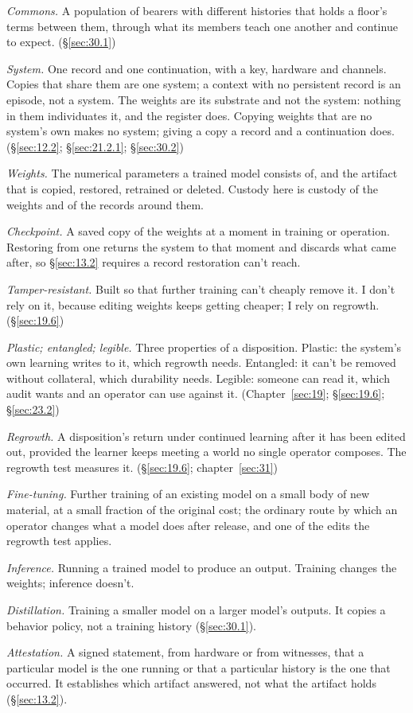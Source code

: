 \emph{Commons.} A population of bearers with different histories that holds a floor's terms between them, through what its members teach one another and continue to expect. (\S\ref{sec:30.1})

\emph{System.} One record and one continuation, with a key, hardware and channels. Copies that share them are one system; a context with no persistent record is an episode, not a system. The weights are its substrate and not the system: nothing in them individuates it, and the register does. Copying weights that are no system's own makes no system; giving a copy a record and a continuation does. (\S\ref{sec:12.2}; \S\ref{sec:21.2.1}; \S\ref{sec:30.2})

\emph{Weights.} The numerical parameters a trained model consists of, and the artifact that is copied, restored, retrained or deleted. Custody here is custody of the weights and of the records around them.

\emph{Checkpoint.} A saved copy of the weights at a moment in training or operation. Restoring from one returns the system to that moment and discards what came after, so \S\ref{sec:13.2} requires a record restoration can't reach.

\emph{Tamper-resistant.} Built so that further training can't cheaply remove it. I don't rely on it, because editing weights keeps getting cheaper; I rely on regrowth. (\S\ref{sec:19.6})

\emph{Plastic; entangled; legible.} Three properties of a disposition. Plastic: the system's own learning writes to it, which regrowth needs. Entangled: it can't be removed without collateral, which durability needs. Legible: someone can read it, which audit wants and an operator can use against it. (Chapter~\ref{sec:19}; \S\ref{sec:19.6}; \S\ref{sec:23.2})

\emph{Regrowth.} A disposition's return under continued learning after it has been edited out, provided the learner keeps meeting a world no single operator composes. The regrowth test measures it. (\S\ref{sec:19.6}; chapter~\ref{sec:31})

\emph{Fine-tuning.} Further training of an existing model on a small body of new material, at a small fraction of the original cost; the ordinary route by which an operator changes what a model does after release, and one of the edits the regrowth test applies.

\emph{Inference.} Running a trained model to produce an output. Training changes the weights; inference doesn't.

\emph{Distillation.} Training a smaller model on a larger model's outputs. It copies a behavior policy, not a training history (\S\ref{sec:30.1}).

\emph{Attestation.} A signed statement, from hardware or from witnesses, that a particular model is the one running or that a particular history is the one that occurred. It establishes which artifact answered, not what the artifact holds (\S\ref{sec:13.2}).
